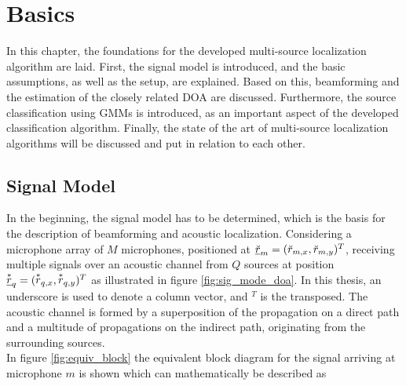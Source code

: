 
%

\chapter{Basics}
\label{chap:Basics}
In this chapter, the foundations for the developed multi-source localization algorithm are laid. First, the signal model is introduced, and the basic assumptions, as well as the setup, are explained. Based on this, beamforming and the estimation of the closely related \ac{DOA} are discussed. Furthermore, the source classification using \acp{GMM} is introduced, as an important aspect of the developed classification algorithm. Finally, the state of the art of multi-source localization algorithms will be discussed and put in relation to each other.

\section{Signal Model}
\label{sec:signal_model}

In the beginning, the signal model has to be determined, which is the basis for the description of beamforming and acoustic localization. Considering a microphone array of $M$ microphones, positioned at $\underline{\breve{r}}_m = (\breve{r}_{m,x},\breve{r}_{m,y})^T$, receiving multiple signals over an acoustic channel from $Q$ sources at position $\vect {\oast r}_q = (\oast r_{q,x}, \oast r_{q,y})^T$ as illustrated in figure \ref{fig:sig_mode_doa}. In this thesis, an underscore is used to denote a column vector, and $^T$ is the transposed. The acoustic channel is formed by a superposition of the propagation on a direct path and a multitude of propagations on the indirect path, originating from the surrounding sources. \\
In figure \ref{fig:equiv_block} the equivalent block diagram for the signal arriving at microphone $m$ is shown which can mathematically be described as

